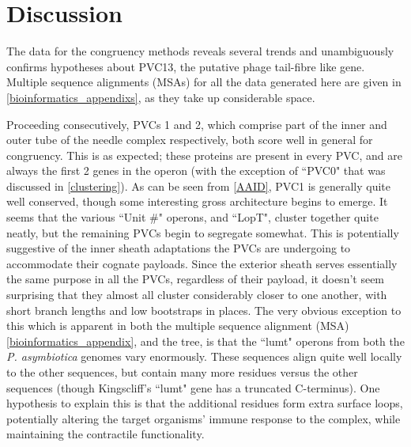 \section{Discussion}
The data for the congruency methods reveals several trends and unambiguously confirms hypotheses about PVC13, the putative phage tail-fibre like gene. Multiple sequence alignments (MSAs) for all the data generated here are given in \vref{bioinformatics_appendixs}, as they take up considerable space. 

Proceeding consecutively, PVCs 1 and 2, which comprise part of the inner and outer tube of the needle complex respectively, both score well in general for congruency. This is as expected; these proteins are present in every PVC, and are always the first 2 genes in the operon (with the exception of ``PVC0" that was discussed in \vref{clustering}). As can be seen from \vref{AAID}, PVC1 is generally quite well conserved, though some interesting gross architecture begins to emerge. It seems that the various ``Unit \#" operons, and ``LopT", cluster together quite neatly, but the remaining PVCs begin to segregate somewhat. This is potentially suggestive of the inner sheath adaptations the PVCs are undergoing to accommodate their cognate payloads. Since the exterior sheath serves essentially the same purpose in all the PVCs, regardless of their payload, it doesn't seem surprising that they almost all cluster considerably closer to one another, with short branch lengths and low bootstraps in places. The very obvious exception to this which is apparent in both the multiple sequence alignment (MSA) \vref{bioinformatics_appendix}, and the tree, is that the ``lumt" operons from both the \emph{P. asymbiotica} genomes vary enormously. These sequences align quite well locally to the other sequences, but contain many more residues versus the other sequences (though Kingscliff's ``lumt" gene has a truncated C-terminus). One hypothesis to explain this is that the additional residues form extra surface loops, potentially altering the target organisms' immune response to the complex, while maintaining the contractile functionality.

